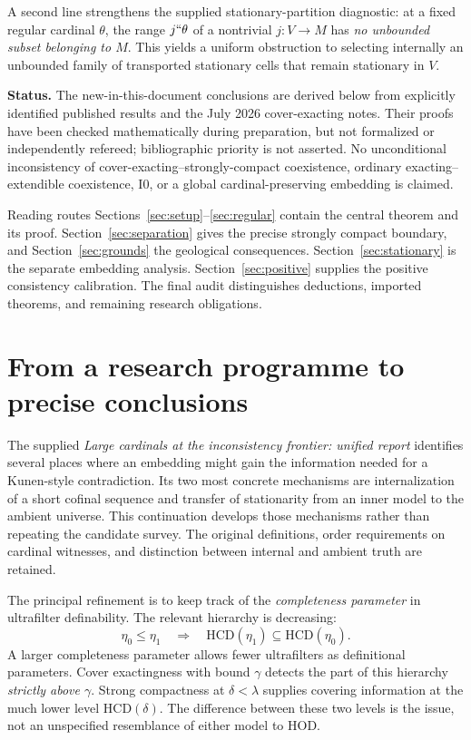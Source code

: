 \documentclass[11pt,letterpaper]{article}
\theoremstyle{definition}
\newcommand{\Izero}{\mathrm{I0}}
\newcommand{\HCD}{\mathrm{HCD}}
\theoremstyle{remark}
\begin{document}
A second line strengthens the supplied stationary-partition diagnostic: at a fixed regular cardinal $\theta$, the range $j``\theta$ of a nontrivial $j:V\to M$ has \emph{no unbounded subset belonging to $M$}. This yields a uniform obstruction to selecting internally an unbounded family of transported stationary cells that remain stationary in $V$.

\textbf{Status.} The new-in-this-document conclusions are derived below from explicitly identified published results and the July 2026 cover-exacting notes. Their proofs have been checked mathematically during preparation, but not formalized or independently refereed; bibliographic priority is not asserted. No unconditional inconsistency of cover-exacting--strongly-compact coexistence, ordinary exacting--extendible coexistence, $\Izero$, or a global cardinal-preserving embedding is claimed.

\clearpage
\tableofcontents
\vspace{10pt}
\begin{assessment}{Reading routes}
Sections~\ref{sec:setup}--\ref{sec:regular} contain the central theorem and its proof. Section~\ref{sec:separation} gives the precise strongly compact boundary, and Section~\ref{sec:grounds} the geological consequences. Section~\ref{sec:stationary} is the separate embedding analysis. Section~\ref{sec:positive} supplies the positive consistency calibration. The final audit distinguishes deductions, imported theorems, and remaining research obligations.
\end{assessment}

\clearpage
\section{From a research programme to precise conclusions}\label{sec:outcome}

The supplied \emph{Large cardinals at the inconsistency frontier: unified report} identifies several places where an embedding might gain the information needed for a Kunen-style contradiction. Its two most concrete mechanisms are internalization of a short cofinal sequence and transfer of stationarity from an inner model to the ambient universe. This continuation develops those mechanisms rather than repeating the candidate survey. The original definitions, order requirements on cardinal witnesses, and distinction between internal and ambient truth are retained.\cite{prior}

The principal refinement is to keep track of the \emph{completeness parameter} in ultrafilter definability. The relevant hierarchy is decreasing:
\[
 \eta_0\leq\eta_1
 \quad\Longrightarrow\quad
 \HCD(\eta_1)\subseteq\HCD(\eta_0).
\]
A larger completeness parameter allows fewer ultrafilters as definitional parameters. Cover exactingness with bound $\gamma$ detects the part of this hierarchy \emph{strictly above $\gamma$}. Strong compactness at $\delta<\lambda$ supplies covering information at the much lower level $\HCD(\delta)$. The difference between these two levels is the issue, not an unspecified resemblance of either model to HOD.
\end{document}
